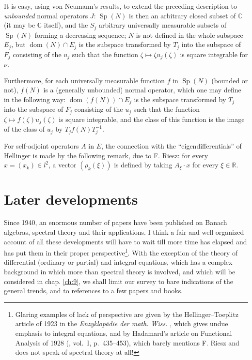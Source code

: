 \documentclass[12pt,a4paper,leqno,twoside]{extbook}
\newcommand{\C}{\mathbb{C}}
\newcommand{\R}{\mathbb{R}}
\newcommand{\dom}{\operatorname{dom}}
\newcommand{\spec}{\operatorname{Sp}}
\begin{document}
It is easy, using von Neumann's results, to extend the preceding description to \emph{unbounded} normal operators \(J\): \(\spec(N)\) is then an arbitrary closed subset of \(\C\) (it may be \(\C\) itself), and the \(S_j\) arbitrary universally measurable subsets of \(\spec(N)\) forming a decreasing sequence; \(N\) is not defined in the whole subspace \(E_j\), but \(\dom(N) \cap E_j\) is the subspace transformed by \(T_j\) into the subspace of \(F_j\) consisting of the \(u_j\) such that the function \(\zeta \mapsto \zeta u_j(\zeta)\) is square integrable for \(\nu\).

Furthermore, for each universally measurable function \(f\) in \(\spec(N)\) (bounded or not), \(f(N)\) is a (generally unbounded) normal operator, which one may define in the following way: \(\dom(f(N)) \cap E_j\) is the subspace transformed by \(T_j\) into the subspace of \(F_j\) consisting of the \(u_j\) such that the function \(\zeta \mapsto f(\zeta) u_j(\zeta)\) is square integrable, and the class of this function is the image of the class of \(u_j\) by \(T_j f(N) T^{-1}_j\).

For self-adjoint operators \(A\) in \(E\), the connection with the ``eigendifferentials'' of Hellinger is made by the following remark, due to F. Riesz: for every \(x = (x_k) \in l^2\), a vector \((\rho_k(\xi))\) is defined by taking \(A_\xi \cdot x\) for every \(\xi \in \R\).

\section{Later developments}
\label{sec:7.6}

Since 1940, an enormous number of papers have been published on Banach algebras, spectral theory and their applications. I think a fair and well organized account of all these developments will have to wait till more time has elapsed and has put them in their proper perspective\footnote{Glaring examples of lack of perspective are given by the Hellinger--Toeplitz article of 1923 in the \emph{Enzyklopädie der math. Wiss.} \cite{107}, which gives undue emphasis to integral equations, and by Hadamard's article on Functional Analysis of 1928 (\cite{094}, vol.~I, p.~435--453), which barely mentions F. Riesz and does not speak of spectral theory at all!}. With the exception of the theory of differential (ordinary or partial) and integral equations, which has a complex background in which more than spectral theory is involved, and which will be considered in chap. \ref{ch:9}, we shall limit our survey to bare indications of the general trends, and to references to a few papers and books.
\end{document}

